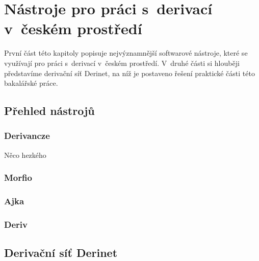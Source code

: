 \hypertarget{nuxe1stroje-pro-pruxe1ci-s-derivacuxed-v-ux10deskuxe9m-prostux159eduxed}{%
\chapter{Nástroje pro práci s~derivací v~českém
prostředí}\label{nuxe1stroje-pro-pruxe1ci-s-derivacuxed-v-ux10deskuxe9m-prostux159eduxed}}

První část této kapitoly popisuje nejvýznamnější softwarové nástroje,
které se využívají pro práci s~derivací v~českém prostředí. V~druhé
části si hlouběji představíme derivační síť Derinet, na níž je postaveno
řešení praktické části této bakalářské práce.

\hypertarget{pux159ehled-nuxe1strojux16f}{%
\section{Přehled nástrojů}\label{pux159ehled-nuxe1strojux16f}}

\hypertarget{derivancze}{%
\subsection{Derivancze}\label{derivancze}}

Něco hezkého~\parencite[516]{pala15}

\hypertarget{morfio}{%
\subsection{Morfio}\label{morfio}}

\hypertarget{ajka}{%
\subsection{Ajka}\label{ajka}}

\hypertarget{deriv}{%
\subsection{Deriv}\label{deriv}}

\hypertarget{derivaux10dnuxed-suxedux165-derinet}{%
\section{Derivační síť
Derinet}\label{derivaux10dnuxed-suxedux165-derinet}}
